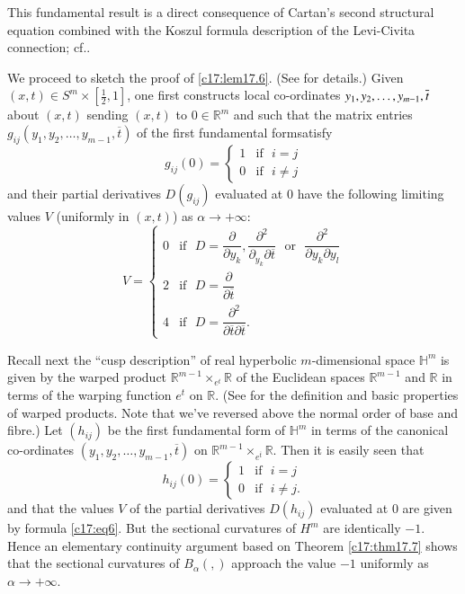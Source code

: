 \begin{remark*}
This fundamental result is a direct consequence of Cartan's second
structural equation combined with the Koszul formula description of
the Levi-Civita connection; cf.\@ \cite[\S\S 5.3 and 6.2]{59}.
\end{remark*}

We proceed to sketch the proof of \ref{c17:lem17.6}. (See \cite{39}
for details.) Given $(x,t)\in S^{m}\times [\frac{1}{2},1]$, one first
constructs local co-ordinates
$y_{1},y_{2},\ldots,\break y_{m-1},\overline{t}$ about $(x,t)$ sending
$(x,t)$ to $0\in \mathbb{R}^{m}$ and such that the matrix entries
$g_{ij}(y_{1},y_{2},\ldots,y_{m-1},\overline{t})$ of the first
fundamental form\pageoriginale satisfy
$$
g_{ij}(0)=
\begin{cases}
1 & \text{if~ } i=j\\
0 & \text{if~ } i\neq j
\end{cases}
$$
and their partial derivatives $D(g_{ij})$ evaluated at $0$ have the
following limiting values $V$ (uniformly in $(x,t)$) as $\alpha\to
+\infty$:
\begin{equation*}
V=
\begin{cases}
0 & \text{if~ } D=\dfrac{\partial}{\partial
  y_{k}},\dfrac{\partial^{2}}{\partial_{y_{k}}\partial\overline{t}}\text{~
  or~ } \dfrac{\partial^{2}}{\partial y_{k}\partial y_{l}}\\[7pt]
2 & \text{if~ } D=\dfrac{\partial}{\partial \overline{t}}\\[7pt]
4 & \text{if~ }
D=\dfrac{\partial^{2}}{\partial\overline{t}\partial\overline{t}}. 
\end{cases}\tag{6}\label{c17:eq6}
\end{equation*}

Recall next the ``cusp description'' of real hyperbolic
$m$-dimensional space $\mathbb{H}^{m}$ is given by the warped product
$\mathbb{R}^{m-1}\times_{e^{t}}\mathbb{R}$ of the Euclidean spaces
$\mathbb{R}^{m-1}$ and $\mathbb{R}$ in terms of the warping function
$e^{t}$ on $\mathbb{R}$. (See \cite[pp. 204-211]{82} for the
definition and basic properties of warped products. Note that we've
reversed above the normal order of base and fibre.) Let $(h_{ij})$ be
the first fundamental form of $\mathbb{H}^{m}$ in terms of the
canonical co-ordinates $(y_{1},y_{2},\ldots,y_{m-1},\overline{t})$ on
$\mathbb{R}^{m-1}\times_{e^{\overline{t}}}\mathbb{R}$. Then it is
easily seen that
$$
h_{ij}(0)=
\begin{cases}
1 & \text{if~ } i=j\\
0 & \text{if~ } i\neq j.
\end{cases}
$$
and that the values $V$ of the partial derivatives $D(h_{ij})$
evaluated at $0$ are given by formula \eqref{c17:eq6}. But the
sectional curvatures of $H^{m}$ are identically $-1$. Hence an
elementary continuity argument based on Theorem \ref{c17:thm17.7}
shows that the sectional curvatures of $B_{\alpha}(,)$ approach the
value $-1$ uniformly as $\alpha\to +\infty$.
